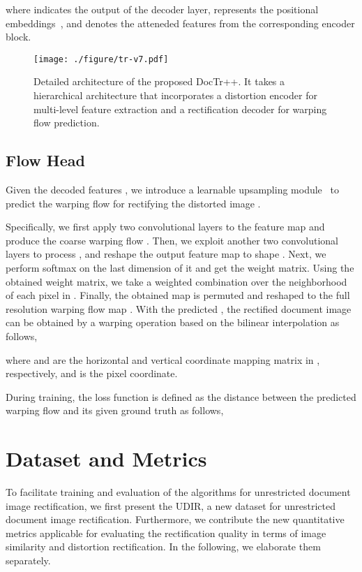 \documentclass[lettersize,journal]{IEEEtran}
\begin{document}
where  indicates the output of the  decoder layer,  represents the positional embeddings~\cite{bello2019attention}, and  denotes the atteneded features from the corresponding encoder block.


\begin{figure}[t]
  \centering
  \texttt{[image: ./figure/tr-v7.pdf]}
  \caption{Detailed architecture of the proposed DocTr++. It takes a hierarchical architecture that incorporates a distortion encoder for multi-level feature extraction and a rectification decoder for warping flow prediction. }
  \label{fig:tr}
\end{figure}


\subsection{Flow Head}
Given the decoded features ,
we introduce a learnable upsampling module~\cite{feng2021doctr} to predict the warping flow  for rectifying the distorted image .

Specifically, we first apply two convolutional layers to the feature map  and produce the coarse warping flow 
.
Then, we exploit another two convolutional layers to process , and reshape the output feature map to shape .
Next, we perform softmax on the last dimension of it and get the weight matrix.
Using the obtained weight matrix, we take a weighted combination over the  neighborhood of each pixel in .
Finally, the obtained  map is permuted and reshaped to the full resolution warping flow map .
With the predicted , the rectified document image  can be obtained by a warping operation based on the bilinear interpolation as follows,

where  and  are the horizontal and vertical coordinate mapping matrix in , respectively, and  is the pixel coordinate.

During training, the loss function is defined as the  distance between the predicted warping flow  and its given ground truth  as follows,






\section{Dataset and Metrics}
To facilitate training and evaluation of the algorithms for unrestricted document image rectification, we first present the UDIR, 
a new dataset for unrestricted document image rectification.
Furthermore, we contribute the new quantitative metrics applicable for evaluating the rectification quality in terms of image similarity and distortion rectification.
In the following, we elaborate them separately.
\end{document}
